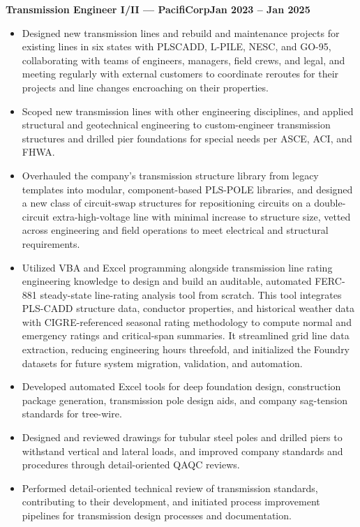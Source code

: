 \documentclass[10pt, letterpaper]{article}
\newcommand{\jobline}[2]{%
  \vspace{5pt}%
  \noindent\textbf{#1}\hfill\textbf{#2}\par%
  \vspace{1pt}%
}
\newenvironment{rlist}{%
  \begin{itemize}[leftmargin=1.4em, itemsep=1pt, topsep=2pt, parsep=0pt]%
}{%
  \end{itemize}%
}
\begin{document}
\jobline{Transmission Engineer I/II --- PacifiCorp}{Jan 2023 -- Jan 2025}
\begin{rlist}
  \item Designed new transmission lines and rebuild and maintenance projects for existing lines in six states with PLSCADD, L-PILE, NESC, and GO-95, collaborating with teams of engineers, managers, field crews, and legal, and meeting regularly with external customers to coordinate reroutes for their projects and line changes encroaching on their properties.
  \item Scoped new transmission lines with other engineering disciplines, and applied structural and geotechnical engineering to custom-engineer transmission structures and drilled pier foundations for special needs per ASCE, ACI, and FHWA.
  \item Overhauled the company's transmission structure library from legacy templates into modular, component-based PLS-POLE libraries, and designed a new class of circuit-swap structures for repositioning circuits on a double-circuit extra-high-voltage line with minimal increase to structure size, vetted across engineering and field operations to meet electrical and structural requirements.
  \item Utilized VBA and Excel programming alongside transmission line rating engineering knowledge to design and build an auditable, automated FERC-881 steady-state line-rating analysis tool from scratch. This tool integrates PLS-CADD structure data, conductor properties, and historical weather data with CIGRE-referenced seasonal rating methodology to compute normal and emergency ratings and critical-span summaries. It streamlined grid line data extraction, reducing engineering hours threefold, and initialized the Foundry datasets for future system migration, validation, and automation.
  \item Developed automated Excel tools for deep foundation design, construction package generation, transmission pole design aids, and company sag-tension standards for tree-wire.
  \item Designed and reviewed drawings for tubular steel poles and drilled piers to withstand vertical and lateral loads, and improved company standards and procedures through detail-oriented QAQC reviews.
  \item Performed detail-oriented technical review of transmission standards, contributing to their development, and initiated process improvement pipelines for transmission design processes and documentation.
\end{rlist}
\end{document}

